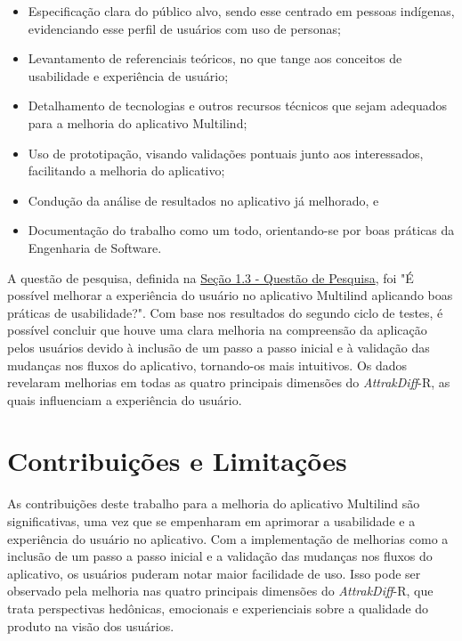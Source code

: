     \begin{itemize}
              \item Especificação clara do público alvo, sendo esse centrado em pessoas indígenas, evidenciando esse perfil de usuários com uso de personas;

              \item Levantamento de referenciais teóricos, no que tange aos conceitos de usabilidade e experiência de usuário;

              \item Detalhamento de tecnologias e outros recursos técnicos que sejam adequados para a melhoria do aplicativo Multilind;

              \item Uso de prototipação, visando validações pontuais junto aos interessados, facilitando a melhoria do aplicativo;

              \item Condução da análise de resultados no aplicativo já melhorado, e
              
              \item Documentação do trabalho como um todo, orientando-se por boas práticas da Engenharia de Software.
    \end{itemize}

A questão de pesquisa, definida na \hyperref[sec:QuestaodePesquisa]{Seção 1.3 - Questão de Pesquisa}, foi "É possível melhorar a experiência do usuário no aplicativo 
Multilind aplicando boas práticas de usabilidade?". Com base nos resultados do segundo ciclo de testes, é possível concluir que houve uma clara melhoria na compreensão da aplicação 
pelos usuários devido à inclusão de um passo a passo inicial e à validação das mudanças nos fluxos do aplicativo, tornando-os mais intuitivos. Os dados revelaram melhorias em todas 
as quatro principais dimensões do \textit{AttrakDiff}-R, as quais influenciam a experiência do usuário.

\section{Contribuições e Limitações}
\label{sec:Contribuições e Limitações}

As contribuições deste trabalho para a melhoria do aplicativo Multilind são significativas, uma vez que se empenharam em aprimorar a usabilidade e a experiência do usuário no aplicativo. 
Com a implementação de melhorias como a inclusão de um passo a passo inicial e a validação das mudanças nos fluxos do aplicativo, os usuários puderam notar maior facilidade de uso. 
Isso pode ser observado pela melhoria nas quatro principais dimensões do \textit{AttrakDiff}-R, que trata perspectivas hedônicas, emocionais e experienciais sobre a qualidade do produto na visão 
dos usuários.

